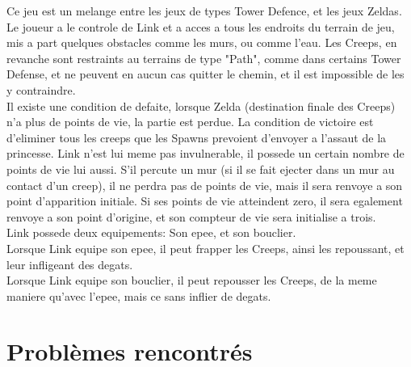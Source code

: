 Ce jeu est un melange entre les jeux de types Tower Defence, et les jeux Zeldas. Le joueur a le controle de Link et a acces a tous les endroits du terrain de jeu, mis a part quelques obstacles comme les murs, ou comme l'eau.
Les Creeps, en revanche sont restraints au terrains de type "Path", comme dans certains Tower Defense, et ne peuvent en aucun cas quitter le chemin, et il est impossible de les y contraindre.\\
Il existe une condition de defaite, lorsque Zelda (destination finale des Creeps) n'a plus de points de vie, la partie est perdue.
La condition de victoire est d'eliminer tous les creeps que les Spawns prevoient d'envoyer a l'assaut de la princesse.
Link n'est lui meme pas invulnerable, il possede un certain nombre de points de vie lui aussi. S'il percute un mur (si il se fait ejecter dans un mur au contact d'un creep), il ne perdra pas de points de vie, mais il sera renvoye a son point d'apparition initiale.
Si ses points de vie atteindent zero, il sera egalement renvoye a son point d'origine, et son compteur de vie sera initialise a trois.\\
Link possede deux equipements: Son epee, et son bouclier.\\
Lorsque Link equipe son epee, il peut frapper les Creeps, ainsi les repoussant, et leur infligeant des degats.\\
Lorsque Link equipe son bouclier, il peut repousser les Creeps, de la meme maniere qu'avec l'epee, mais ce sans inflier de degats.\\


\section{Problèmes rencontrés}
